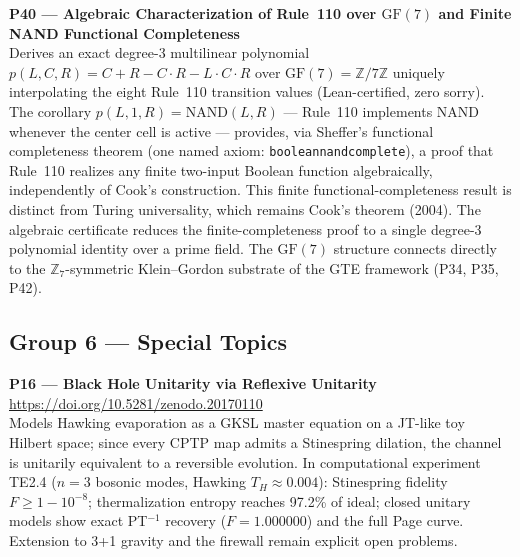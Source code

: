 \documentclass[11pt]{article}
\newcommand{\lean}[1]{%
  \penalty-100
  \begingroup\def\_{{\textunderscore\allowbreak}}\texttt{#1}\endgroup}
\begin{document}
\medskip
\noindent\textbf{P40 — Algebraic Characterization of Rule~110 over $\mathrm{GF}(7)$
and Finite NAND Functional Completeness}~\cite{SpivackGF7Universality}\\
Derives an exact degree-3 multilinear polynomial
$p(L,C,R) = C + R - C{\cdot}R - L{\cdot}C{\cdot}R$ over $\mathrm{GF}(7) = \mathbb{Z}/7\mathbb{Z}$
uniquely interpolating the eight Rule~110 transition values (Lean-certified, zero sorry).
The corollary $p(L,1,R) = \mathrm{NAND}(L,R)$ — Rule~110 implements NAND whenever the
center cell is active — provides, via Sheffer's functional completeness theorem (one
named axiom: \lean{boolean\_nand\_complete}), a proof that Rule~110 realizes any finite
two-input Boolean function algebraically, independently of Cook's construction.  This
finite functional-completeness result is distinct from Turing universality, which
remains Cook's theorem (2004).  The algebraic certificate reduces the finite-completeness
proof to a single degree-3 polynomial identity over a prime field.  The $\mathrm{GF}(7)$
structure connects directly to the $\mathbb{Z}_7$-symmetric Klein--Gordon substrate of the
GTE framework (P34, P35, P42).

\subsection{Group 6 — Special Topics}

\medskip
\noindent\textbf{P16 — Black Hole Unitarity via Reflexive Unitarity}~\cite{SpivackBHUnitarity}\\
\url{https://doi.org/10.5281/zenodo.20170110}\\
Models Hawking evaporation as a GKSL master equation on a JT-like toy Hilbert
space; since every CPTP map admits a Stinespring dilation, the channel is unitarily
equivalent to a reversible evolution.  In computational experiment TE2.4
($n=3$ bosonic modes, Hawking $T_H \approx 0.004$): Stinespring fidelity
$F \ge 1-10^{-8}$; thermalization entropy reaches 97.2\% of ideal; closed
unitary models show exact PT$^{-1}$ recovery ($F=1.000000$) and the full Page
curve.  Extension to 3+1 gravity and the firewall remain explicit open problems.
\end{document}
